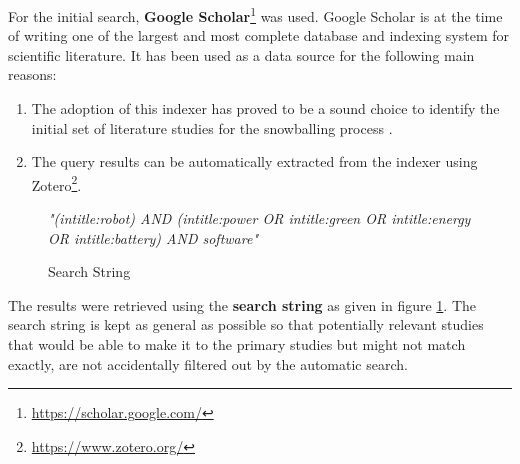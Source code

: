 For the initial search, \textbf{Google Scholar}\footnote{\url{https://scholar.google.com/}} was used. 
Google Scholar is at the time of writing one of the largest and most complete database and indexing system for scientific literature.
It has been used as a data source for the following main reasons:
\begin{enumerate}
    \item The adoption of this indexer has proved to be a sound choice to identify the initial set 
    of literature studies for the snowballing process \cite{wohlin2014snowballing}.
    \item The query results can be automatically extracted from the indexer using Zotero\footnote{\url{https://www.zotero.org/}}.
\end{enumerate}

\begin{figure}
    \centering
    \textit{"(intitle:robot) AND (intitle:power OR intitle:green OR intitle:energy OR intitle:battery) AND software"}
    \caption{Search String}
    \label{fig:search_string}
\end{figure}

The results were retrieved using the \textbf{search string} as given in figure \ref{fig:search_string}. 
The search string is kept as general as possible so that potentially relevant studies that would be able to make it 
to the primary studies but might not match exactly, are not accidentally filtered out by the automatic search.

